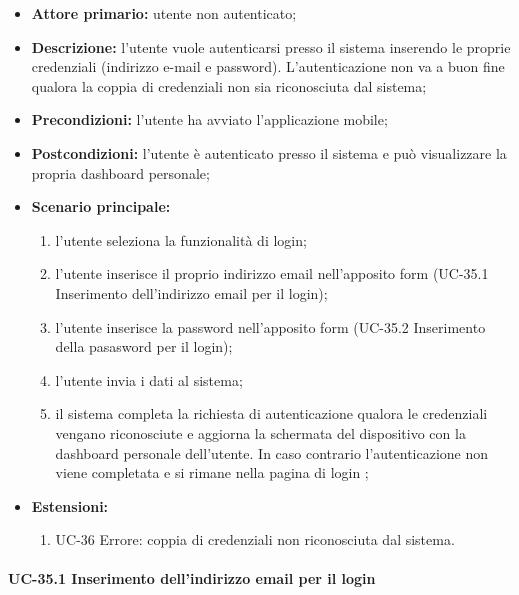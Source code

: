 	\begin{itemize}
		\item \textbf{Attore primario:} utente non autenticato;

		\item \textbf{Descrizione:} l'utente vuole autenticarsi presso il sistema inserendo le proprie credenziali (indirizzo e-mail e password). L'autenticazione non va a buon fine qualora la coppia di credenziali non sia riconosciuta dal sistema;

		\item \textbf{Precondizioni:} l'utente ha avviato l'applicazione mobile;

		\item \textbf{Postcondizioni:} l'utente è autenticato presso il sistema e può visualizzare la propria dashboard personale;

		\item \textbf{Scenario principale:}
	  		\begin{enumerate}
		  		\item l'utente seleziona la funzionalità di login;
		  		\item l'utente inserisce il proprio indirizzo email nell'apposito form (UC-35.1 Inserimento dell'indirizzo email per il login);
		  		\item l'utente inserisce la password nell'apposito form (UC-35.2  Inserimento della pasasword per il login);
		  		\item l'utente invia i dati al sistema;
		  		\item il sistema completa la richiesta di autenticazione qualora le credenziali vengano riconosciute e aggiorna la schermata del dispositivo con la dashboard personale dell'utente. In caso contrario l'autenticazione non viene completata e si rimane nella pagina di login ;
	  		\end{enumerate}
	  	\item \textbf{Estensioni:}
	  		\begin{enumerate}
		  		\item UC-36 Errore: coppia di credenziali non riconosciuta dal sistema.
	  		\end{enumerate}
	\end{itemize}


\paragraph{UC-35.1 Inserimento dell'indirizzo email per il login}

